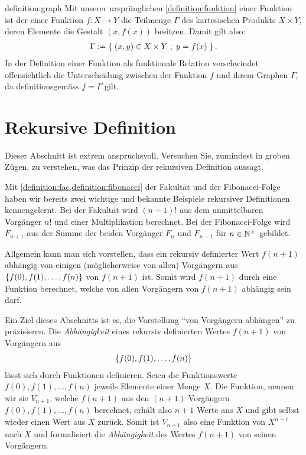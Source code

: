\begin{definition}{definition:graph}
Mit unserer ursprünglichen \cref{definition:funktion} einer Funktion ist der  einer Funktion $f: X\to Y$ die Teilmenge $\Gamma$ des kartesischen Produkts $X\times Y$, deren Elemente die Gestalt $(x,f(x))$ besitzen. Damit gilt also:
\begin{align*}
    \Gamma := \left\{\;(x,y)\in X\times Y \; ; \; y = f(x) \;\right\}.
\end{align*}
In der Definition einer Funktion als funktionale Relation verschwindet offensichtlich die Unterscheidung zwischen der Funktion $f$ und ihrem Graphen $\Gamma$, da definitionsgemäss $f = \Gamma$ gilt.
\end{definition}


\section{Rekursive Definition}\label{sec:rekursion}
Dieser Abschnitt ist extrem anspruchsvoll. Versuchen Sie, zumindest in groben Zügen, zu verstehen, was das Prinzip der rekursiven Definition aussagt.

\noindent
Mit \cref{definition:fac,definition:fibonacci} der Fakultät und der Fibonacci-Folge haben wir bereits zwei wichtige und bekannte Beispiele rekursiver Definitionen kennengelernt. Bei der Fakultät wird $(n+1)!$ aus dem unmittelbaren Vorgänger $n!$ und einer Multiplikation berechnet. Bei der Fibonacci-Folge wird $F_{n+1}$ aus der Summe der beiden Vorgänger $F_{n}$ und $F_{n-1}$ für $n\in\mathbb{N}^{\times}$ gebildet.
\begin{myBox}{}
    Allgemein kann man sich vorstellen, dass ein rekursiv definierter Wert $f(n+1)$ abhängig von einigen (möglicherweise von allen) Vorgängern aus $\left\{f(0), f(1),\ldots, f(n)\right\}$ von $f(n+1)$ ist. Somit wird $f(n+1)$ durch eine Funktion berechnet, welche von allen Vorgängern von $f(n+1)$ abhängig sein darf.
\end{myBox}
Ein Ziel dieses Abschnitts ist es, die Vorstellung \enquote{von Vorgängern abhängen} zu präzisieren. Die \textit{Abhängigkeit} eines rekursiv definierten Wertes $f(n+1)$ von Vorgängern aus
\begin{align*}
    \left\{f(0), f(1),\ldots ,f(n)\right\}
\end{align*}
lässt sich durch Funktionen definieren. Seien die Funktionswerte $f(0), f(1),\ldots ,f(n)$ jeweils Elemente einer Menge $X$. Die Funktion, nennen wir sie $V_{n+1}$, welche $f(n+1)$ aus den $(n+1)$ Vorgängern $f(0), f(1),\ldots , f(n)$ berechnet, erhält also $n+1$ Werte aus $X$ und gibt selbst wieder einen Wert aus $X$ zurück. Somit ist $V_{n+1}$ also eine Funktion von $X^{n+1}$ nach $X$ und formalisiert die \textit{Abhängigkeit} des Wertes $f(n+1)$ von seinen Vorgängern.

